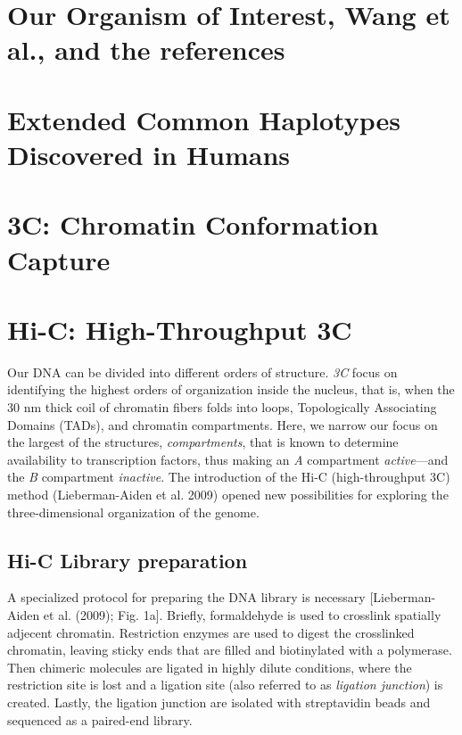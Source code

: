 \documentclass[
  11pt,
  a4paper,
]{scrbook}
\let\oldemph\emph
\renewcommand\emph[1]{\oldemph{\color{gray}#1}}
\begin{document}
\section{Our Organism of Interest, Wang et al., and the
references}\label{our-organism-of-interest-wang-et-al.-and-the-references}

\section{Extended Common Haplotypes Discovered in
Humans}\label{extended-common-haplotypes-discovered-in-humans}

\section{3C: Chromatin Conformation
Capture}\label{c-chromatin-conformation-capture}

\section{Hi-C: High-Throughput 3C}\label{hi-c-high-throughput-3c}

Our DNA can be divided into different orders of structure. \emph{3C}
focus on identifying the highest orders of organization inside the
nucleus, that is, when the 30 nm thick coil of chromatin fibers folds
into loops, Topologically Associating Domains (TADs), and chromatin
compartments. Here, we narrow our focus on the largest of the
structures, \emph{compartments}, that is known to determine availability
to transcription factors, thus making an \emph{A} compartment
\emph{active}---and the \emph{B} compartment \emph{inactive}. The
introduction of the Hi-C (high-throughput 3C) method (Lieberman-Aiden et
al. 2009) opened new possibilities for exploring the three-dimensional
organization of the genome.

\subsection{Hi-C Library preparation}\label{hi-c-library-preparation}

A specialized protocol for preparing the DNA library is necessary
{[}Lieberman-Aiden et al. (2009); Fig. 1a{]}. Briefly, formaldehyde is
used to crosslink spatially adjecent chromatin. Restriction enzymes are
used to digest the crosslinked chromatin, leaving sticky ends that are
filled and biotinylated with a polymerase. Then chimeric molecules are
ligated in highly dilute conditions, where the restriction site is lost
and a ligation site (also referred to as \emph{ligation junction}) is
created. Lastly, the ligation junction are isolated with streptavidin
beads and sequenced as a paired-end library.
\end{document}
